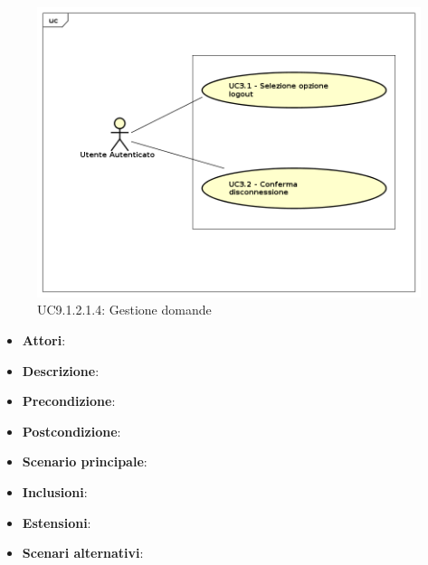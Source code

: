 					\label{UC9.1.2.1.4}
					\begin{figure}[h]
						\centering
					\includegraphics[scale=0.7,keepaspectratio]{UML/UC9.png}
						\caption{UC9.1.2.1.4: Gestione domande}
					\end{figure}
					\FloatBarrier
					\begin{itemize}
						\item \textbf{Attori}: 
						\item \textbf{Descrizione}: 
						\item \textbf{Precondizione}: 
						\item \textbf{Postcondizione}: 
						\item \textbf{Scenario principale}:
						\item \textbf{Inclusioni}:
						\item \textbf{Estensioni}:
						\item \textbf{Scenari alternativi}:
					\end{itemize}
					

